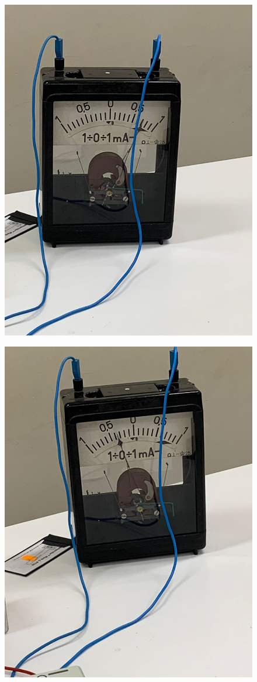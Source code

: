 \documentclass[twocolumn, 12pt]{article}
\begin{document}
\begin{figure}[H]
	\includegraphics[width=0.9\linewidth]{./Images/Galvanometro1.jpeg}
\end{figure}

\begin{figure}[H]
	\includegraphics[width=0.9\linewidth]{./Images/Galvanometro2.jpeg}
\end{figure}
\end{document}
